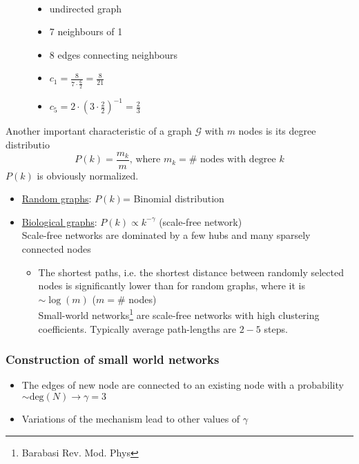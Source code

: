 \begin{figure}[H]
\begin{multicols}{2}
\\\columnbreak
\begin{itemize}[label={$\bullet$}]
\item undirected graph
\item 7 neighbours of 1
\item 8 edges connecting neighbours
\item $c_1=\frac{8}{7\cdot\frac{6}{2}}=\frac{8}{21}$
\item $c_5=2\cdot\left(3\cdot\frac{2}{2}\right)^{-1}=\frac{2}{3}$
\end{itemize}
\end{multicols}
\end{figure}
\noindent Another important characteristic of a graph $\mathcal{G}$ with $m$ nodes is its degree distributio
\begin{equation*}
P(k)=\frac{m_k}{m}\text{, where $m_k=\#$ nodes with degree $k$}
\end{equation*}
$P(k)$ is obviously normalized.
\begin{itemize}[label={}]
\item \underline{Random graphs}: $P(k)$= Binomial distribution
\item \underline{Biological graphs}: $P(k)\propto k^{-\gamma}$ (scale-free network)\\
Scale-free networks are dominated by a few hubs and many sparsely connected nodes
\begin{itemize}[label={$-$}]
\item The shortest paths, i.e. the shortest distance between randomly selected nodes is significantly lower than for random graphs, where it is $\sim\log(m)$ ($m=\#$ nodes)\\
\grqq{}Small-world\grqq{} networks\footnote{Barabasi Rev. Mod. Phys} are scale-free networks with high clustering coefficients. Typically average path-lengths are $\num{2}-\num{5}$ steps.
\end{itemize}
\end{itemize}
\subsubsection{Construction of small world networks}
\begin{itemize}[label={$-$}]
\item The edges of new node are connected to an existing node with a probability $\sim\text{deg}(N) \to \gamma =3$
\item Variations of the mechanism lead to other values of $\gamma$
\end{itemize}
